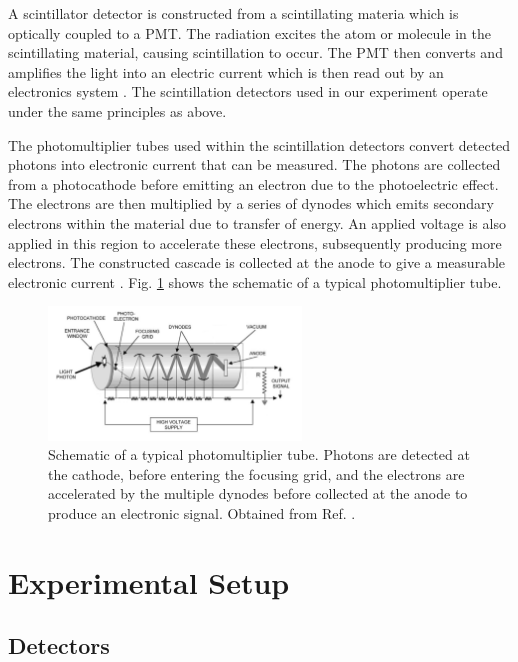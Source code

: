 \documentclass[a4paper]{report}
\numberwithin{equation}{section}
\begin{document}
A scintillator detector is constructed from a scintillating materia which is optically coupled to a PMT. The radiation excites the 
atom or molecule in the scintillating material, causing scintillation to occur. The PMT then converts and amplifies the light into 
an electric current which is then read out by an electronics system \cite{Leo1994}. The scintillation detectors used in our experiment 
operate under the same principles as above. \par 


The photomultiplier tubes used within the scintillation detectors convert detected photons into electronic current that can 
be measured. The photons are collected from a photocathode before emitting an electron due to the photoelectric effect. The electrons 
are then multiplied by a series of dynodes which emits secondary electrons within the material due to transfer of energy. An applied 
voltage is also applied in this region to accelerate these electrons, subsequently producing more electrons. The constructed cascade is 
collected at the anode to give a measurable electronic current \cite{Leo1994}. Fig. \ref{fig:pmt_schematic} shows the schematic of a typical photomultiplier tube. 


\begin{figure}[!h]
	\centering
	\includegraphics[width=0.6\textwidth]{pmt_schematic.png}
	\caption{Schematic of a typical photomultiplier tube. Photons are detected at the cathode, before entering the focusing grid,
	 and the electrons are accelerated by the multiple dynodes before collected at the anode to produce an electronic signal.
	 Obtained from Ref. \cite{Danisch2014}.}
	\label{fig:pmt_schematic}	
\end{figure}


\chapter{Experimental Setup} \label{chap:exp_setup}

\section{Detectors}
\end{document}
